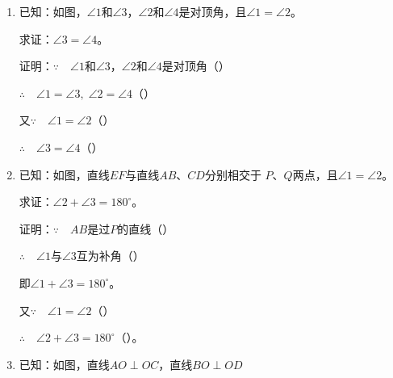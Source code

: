 \begin{Exercise}
\begin{question}
\begin{enumerate}
\begin{figurehere}
\begin{minipage}[b]{0.48\linewidth}
    \caption*{第2(d)题}
    \end{minipage}
    \begin{minipage}[b]{0.48\linewidth}
    \centering
    \begin{tikzpicture}[>=latex, scale=1]
    \end{tikzpicture}
    \caption*{第2(e)题}
    \end{minipage}
    \end{figurehere}

\item 已知：如图，$\angle 1$和$\angle 3$，$\angle 2$和$\angle 4$是对顶角，且$\angle 1=\angle 2$。

求证：$\angle 3=\angle 4$。

证明：$\because\quad \angle 1$和$\angle 3$，$\angle 2$和$\angle 4$是对顶角（\qquad）

$\therefore\quad \angle 1=\angle 3,\; \angle 2=\angle 4$（\qquad）

又$\because\quad \angle 1=\angle 2$（\qquad ）

$\therefore\quad \angle 3=\angle 4$（\qquad ）

\item 已知：如图，直线$EF$与直线$AB$、$CD$分别相交于
$P$、$Q$两点，且$\angle 1=\angle 2$。

求证：$\angle 2+\angle 3=180^{\circ}$。

证明：$\because\quad AB$是过$P$的直线（\qquad）

$\therefore\quad \angle 1$与$\angle 3$互为补角（\qquad）

即$\angle 1+\angle 3=180^{\circ}$。

又$\because\quad \angle 1=\angle 2$（\qquad）

$\therefore\quad \angle 2+\angle 3=180^{\circ}$（\qquad ）。

\item 已知：如图，直线$AO\perp OC$，直线$BO\perp OD$


\end{enumerate}
\end{question}
\end{Exercise}
